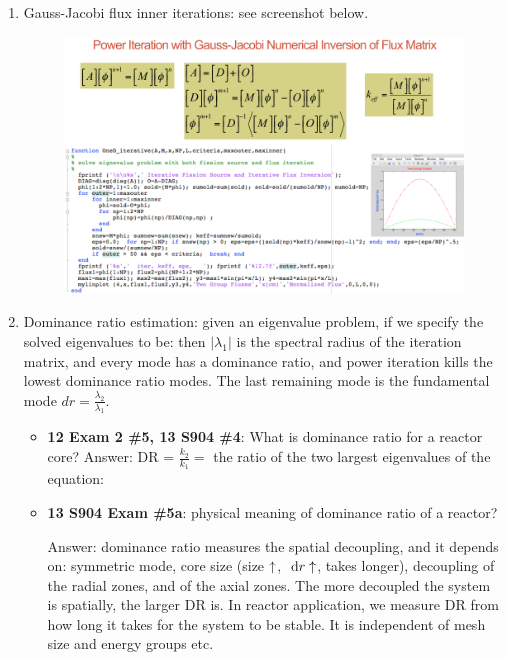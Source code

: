 \documentclass{school-22.211-notes}
\begin{document}
\begin{enumerate}
\item Gauss-Jacobi flux inner iterations: see screenshot below.
\begin{figure}[ht]
  \centering
  \includegraphics[width=5in]{images/dfs/power-iteration-Gauss-Jacobi.png}
\end{figure}

\item Dominance ratio estimation: given an eigenvalue problem, if we specify the solved eigenvalues to be:
then $|\lambda_1|$ is the spectral radius of the iteration matrix, and every mode has a dominance ratio,
and power iteration kills the lowest dominance ratio modes. The last remaining mode is the fundamental mode $dr = \frac{\lambda_2}{\lambda_1}$. 
\begin{itemize}
\item \textbf{12 Exam 2 \#5, 13 S904 \#4}: What is dominance ratio for a reactor core? Answer: DR = $\frac{k_2}{k_1} = $ the ratio of the two largest eigenvalues of the equation: 

\item \textbf{13 S904 Exam \#5a}: physical meaning of dominance ratio of a reactor? 

Answer: dominance ratio measures the spatial decoupling, and it depends on: symmetric mode, core size (size $\uparrow$, $\mbox{ }\mathrm{d} r \uparrow$, takes longer), decoupling of the radial zones, and of the axial zones. The more decoupled the system is spatially, the larger DR is. In reactor application, we measure DR from how long it takes for the system to be stable. It is independent of mesh size and energy groups etc. 


\end{itemize}
\end{enumerate}
\end{document}
